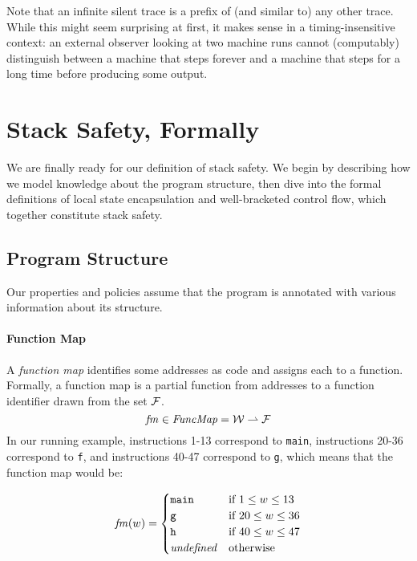 \documentclass[acmsmall,review,anonymous]{acmart}\settopmatter{printfolios=true,printccs=false,printacmref=false}
\begin{document}
{Note that an infinite silent trace is a
prefix of (and similar to) any other trace. While this might seem
surprising at first, it makes sense in a timing-insensitive context:
an external observer looking at two machine runs cannot (computably)
distinguish between a machine that steps forever and a machine that
steps for a long time before producing some output.

\section{Stack Safety, Formally}
\label{sec:lse-and-wbcf}

We are finally ready for our definition of stack safety. We begin
by describing how we model knowledge about the program structure,
then dive into the formal definitions of local state encapsulation and
well-bracketed control flow, which together constitute stack safety.

\subsection{Program Structure}

Our properties and policies assume that the program is annotated
with various information about its structure.

\paragraph*{Function Map}

A {\em function map} identifies some addresses as code and assigns
each to a function. Formally, a function map is a
partial function from addresses to a function
identifier drawn from the set \(\mathcal{F}\).
\[\mathit{fm} \in \mathit{FuncMap} = {\mathcal W} \rightharpoonup \mathcal{F}\]
%
In our running example, instructions 1-13 correspond to {\tt main},
instructions 20-36 correspond to {\tt f}, and instructions 40-47
correspond to {\tt g}, which means that the function map would be:

\[ \mathit{fm}(w) =
  \begin{cases}
    \texttt{main} & \text{if } 1 \leq w \leq 13 \\
    \texttt{g} & \text{if } 20 \leq w \leq 36 \\
    \texttt{h} & \text{if } 40 \leq w \leq 47 \\
    \mathit{undefined} & \text {otherwise}\\
  \end{cases}
\]

}
\end{document}
